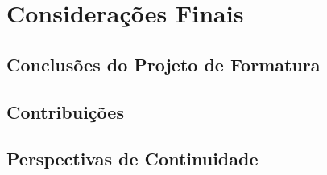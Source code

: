 \documentclass[]{politex}
\begin{document}
\chapter{Considerações Finais}
\section{Conclusões do Projeto de Formatura}
\section{Contribuições}
\section{Perspectivas de Continuidade}



%

%
\end{document}
